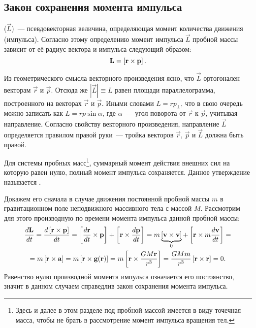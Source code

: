 \subsection{Закон сохранения момента импульса}
 ($\vec{L}$)~--- псевдовекторная величина, определяющая момент количества движения (импульса). Согласно этому определению момент импульса $\vec{L}$ пробной массы зависит от её радиус-вектора и импульса следующий образом:
\begin{equation}
	\mathbf{L} = \left[\mathbf{r} \times \mathbf{p}\right].
\end{equation}

Из геометрического смысла векторного произведения ясно, что $\vec{L}$ ортогонален векторам $\vec{r}$ и $\vec{p}$. Отсюда же $|\vec{L}| \equiv L$ равен площади параллелограмма, построенного на векторах $\vec{r}$ и $\vec p$. Иными словами $L = rp_\perp$, что в свою очередь можно записать как $ L = r p \sin \alpha$, где $\alpha$~--- угол поворота от $\vec{r}$ к $\vec p$, учитывая направление. Согласно свойству векторного произведения, направление $\vec L$ определяется правилом правой руки~--- тройка векторов $\vec r$, $\vec p$ и $\vec L$ должна быть правой.

Для системы пробных масс\footnote{Здесь и далее в этом разделе под пробной массой имеется в виду точечная масса, чтобы не брать в рассмотрение момент импульса вращения тел.}, суммарный момент действия внешних сил на которую равен нулю, полный момент импульса сохраняется. Данное утверждение называется .

Докажем его сначала в случае движения постоянной пробной массы $m$ в гравитационном поле неподвижного массивного тела с массой $M$. Рассмотрим для этого производную по времени момента импульса данной пробной массы:
\begin{multline}
	\frac{d\mathbf{L}}{dt} = \frac{d\left[\mathbf{r} \times \mathbf{p}\right]}{dt} = \left[ \frac{d \mathbf{r}}{dt} \times \mathbf{p} \right] + \left[\mathbf{r} \times \frac{d\mathbf{p}}{dt} \right] = m \underbrace{\left[\mathbf{v} \times \mathbf{v}\right]}_0 + \left[\mathbf{r} \times m \frac{d\mathbf{v}}{dt} \right] = \\
	= m \left[\mathbf{r} \times \mathbf{a}\right] = m \left[\mathbf{r} \times \mathbf{g(r)}\right] = m \left[\mathbf{r} \times \frac{G M \mathbf{r}}{r^3} \right] =  \frac{G M m}{r^3} \left[\mathbf{r} \times \mathbf{r}\right] = 0.
\end{multline}
Равенство нулю производной момента импульса означается его постоянство, значит в данном случаем справедлив закон сохранения момента импульса.

